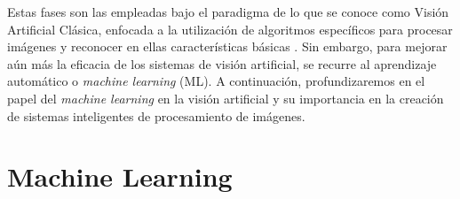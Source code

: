  
 
 

Estas fases son las empleadas bajo el paradigma de lo que se conoce como Visión
Artificial Clásica, enfocada a la utilización de algoritmos específicos para procesar imágenes y reconocer en ellas características básicas \cite{Martinez22}.%
Sin embargo, para mejorar aún más la eficacia de los sistemas de visión artificial, se recurre al aprendizaje automático o \textit{machine learning} (ML). A continuación, profundizaremos en el papel del \textit{machine learning} en la visión artificial y su importancia en la creación de sistemas inteligentes de procesamiento de imágenes. 

\section{Machine Learning}
\label{sec:MachineLearning} 

